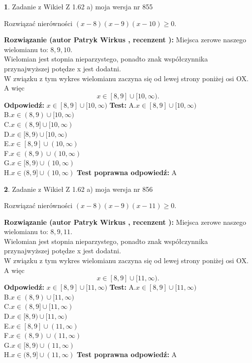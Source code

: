\documentclass[12pt, a4paper]{article}
\theoremstyle{definition} %
\newtheorem{zad}{}
\newcommand{\zadStart}[1]{\begin{zad}#1\newline}
\newcommand{\zadStop}{\end{zad}}
\newcommand{\rozwStart}[2]{\noindent \textbf{Rozwiązanie (autor #1 , recenzent #2): }\newline}
\newcommand{\rozwStop}{\newline}
\newcommand{\odpStart}{\noindent \textbf{Odpowiedź:}\newline}
\newcommand{\odpStop}{\newline}
\newcommand{\testStart}{\noindent \textbf{Test:}\newline}
\newcommand{\testStop}{\newline}
\newcommand{\kluczStart}{\noindent \textbf{Test poprawna odpowiedź:}\newline}
\newcommand{\kluczStop}{\newline}
\begin{document}
\zadStart{Zadanie z Wikieł Z 1.62 a) moja wersja nr 855}

Rozwiązać nierówności $(x-8)(x-9)(x-10)\ge0$.
\zadStop
\rozwStart{Patryk Wirkus}{}
Miejsca zerowe naszego wielomianu to: $8, 9, 10$.\\
Wielomian jest stopnia nieparzystego, ponadto znak współczynnika przy\linebreak najwyższej potędze x jest dodatni.\\ W związku z tym wykres wielomianu zaczyna się od lewej strony poniżej osi OX. A więc $$x \in [8,9] \cup [10,\infty).$$
\rozwStop
\odpStart
$x \in [8,9] \cup [10,\infty)$
\odpStop
\testStart
A.$x \in [8,9] \cup [10,\infty)$\\
B.$x \in (8,9) \cup [10,\infty)$\\
C.$x \in (8,9] \cup [10,\infty)$\\
D.$x \in [8,9) \cup [10,\infty)$\\
E.$x \in [8,9] \cup (10,\infty)$\\
F.$x \in (8,9) \cup (10,\infty)$\\
G.$x \in [8,9) \cup (10,\infty)$\\
H.$x \in (8,9] \cup (10,\infty)$
\testStop
\kluczStart
A
\kluczStop



\zadStart{Zadanie z Wikieł Z 1.62 a) moja wersja nr 856}

Rozwiązać nierówności $(x-8)(x-9)(x-11)\ge0$.
\zadStop
\rozwStart{Patryk Wirkus}{}
Miejsca zerowe naszego wielomianu to: $8, 9, 11$.\\
Wielomian jest stopnia nieparzystego, ponadto znak współczynnika przy\linebreak najwyższej potędze x jest dodatni.\\ W związku z tym wykres wielomianu zaczyna się od lewej strony poniżej osi OX. A więc $$x \in [8,9] \cup [11,\infty).$$
\rozwStop
\odpStart
$x \in [8,9] \cup [11,\infty)$
\odpStop
\testStart
A.$x \in [8,9] \cup [11,\infty)$\\
B.$x \in (8,9) \cup [11,\infty)$\\
C.$x \in (8,9] \cup [11,\infty)$\\
D.$x \in [8,9) \cup [11,\infty)$\\
E.$x \in [8,9] \cup (11,\infty)$\\
F.$x \in (8,9) \cup (11,\infty)$\\
G.$x \in [8,9) \cup (11,\infty)$\\
H.$x \in (8,9] \cup (11,\infty)$
\testStop
\kluczStart
A
\kluczStop
\end{document}
